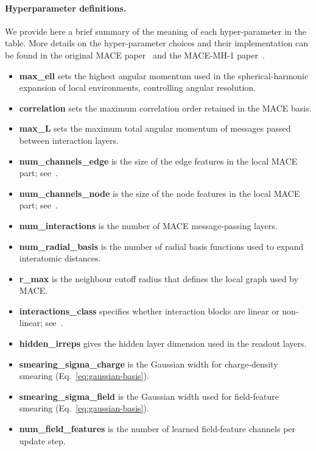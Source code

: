 \documentclass[aps,%
superscriptaddress,
 amsmath,amssymb,
floatfix,
twocolumn
]{revtex4-2}
\begin{document}
\paragraph{Hyperparameter definitions.}
\noindent We provide here a brief summary of the meaning of each hyper-parameter in the table. More details on the hyper-parameter choices and their implementation can be found in the original MACE paper~\cite{batatia_mace_2023} and the MACE-MH-1 paper~\cite{batatia2025crosslearningelectronicstructure}.
\begin{itemize}
  \item \textbf{max\_ell} sets the highest angular momentum used in the spherical-harmonic expansion of local environments, controlling angular resolution.
  \item \textbf{correlation} sets the maximum correlation order retained in the MACE basis.
  \item \textbf{max\_L} sets the maximum total angular momentum of messages passed between interaction layers.
  \item \textbf{num\_channels\_edge} is the size of the edge features in the local MACE part; see~\cite{batatia2025crosslearningelectronicstructure}.
  \item \textbf{num\_channels\_node} is the size of the node features in the local MACE part; see~\cite{batatia2025crosslearningelectronicstructure}.
  \item \textbf{num\_interactions} is the number of MACE message-passing layers.
  \item \textbf{num\_radial\_basis} is the number of radial basis functions used to expand interatomic distances.
  \item \textbf{r\_max} is the neighbour cutoff radius that defines the local graph used by MACE.
  \item \textbf{interactions\_class} specifies whether interaction blocks are linear or non-linear; see~\cite{batatia2025crosslearningelectronicstructure}.
  \item \textbf{hidden\_irreps} gives the hidden layer dimension used in the readout layers.
  \item \textbf{smearing\_sigma\_charge} is the Gaussian width for charge-density smearing (Eq.~\ref{eq:gaussian-basis}).
  \item \textbf{smearing\_sigma\_field} is the Gaussian width used for field-feature smearing (Eq.~\ref{eq:gaussian-basis}).
  \item \textbf{num\_field\_features} is the number of learned field-feature channels per update step.

\end{itemize}
\end{document}
